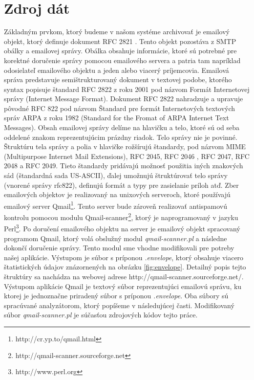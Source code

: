 \documentclass[11pt,twoside,a4paper]{book}
\begin{document}
\section{Zdroj dát}
Základným prvkom, ktorý budeme v našom systéme archivovať je emailový objekt, ktorý definuje dokument RFC 2821 \cite{Klensin:2001:SMT:RFC2821}. Tento objekt pozostáva z SMTP obálky a emailovej správy. Obálka obsahuje informácie, ktoré sú potrebné pre korektné doručenie správy pomocou emailového servera a patria tam napríklad odosielateľ emailového objektu a jeden alebo viacerý príjemcovia. Emailová správa predstavuje semištrukturovaný dokument \cite{Udell} v textovej podobe, ktorého syntax popisuje štandard RFC 2822 \cite{Resnick:2001:IMF:RFC2822} z roku 2001 pod názvom Formát Internetovej správy (Internet Message Format). Dokument RFC 2822 nahradzuje a upravuje pôvodné RFC 822 pod názvom Štandard pre formát Internetových textových správ ARPA z roku 1982 (Standard for the Fromat of ARPA Internet Text Messages). Obsah emailovej správy delíme na hlavičku a telo, ktoré sú od seba oddelené znakom reprezentujúcim prázdny riadok. Telo správy nie je povinné. Štruktúru tela správy a polia v hlavičke rožšírujú štandardy, pod názvom MIME (Multipurpose Internet Mail Extensions), RFC 2045, RFC 2046 \cite{Freed:1996:MIM:RFC2045,Freed:1996:MIM:RFC2046}, RFC 2047, RFC 2048 a RFC 2049. Tieto štandardy pridávajú možnosť použitia iných znakových sád (štandardná sada US-ASCII), ďalej umožnujú štruktúrovať telo správy (vnorené správy rfc822), definujú formát a typy pre zasielanie príloh atď.
Zber emailových objektov je realizovaný na unixových serveroch, ktoré používajú emailový server Qmail\footnote{http://cr.yp.to/qmail.html}. Tento server bude zároveň realizovať antispamovú kontrolu pomocou modulu Qmail-scanner\footnote{http://qmail-scanner.sourceforge.net}, ktorý je naprogramovaný v jazyku Perl\footnote{http://www.perl.org}. Po doručení emailového objektu na server je emailový objekt spracovaný programom Qmail, ktorý volá obslužný modul \emph{qmail-scanner.pl} a následne dokončí doručenie správy. Tento modul sme vhodne modifikovali pre potreby našej aplikácie. Výstupom je súbor s príponou \emph{.envelope}, ktorý obsahuje viacero štatistických údajov znázornených na obrázku \ref{fig:envelope}. Detailný popis tejto štruktúry sa nachádza na webovej adrese http://qmail-scanner.sourceforge.net/. Výstupom aplikácie Qmail je textový súbor reprezentujúci emailovú správu, ku ktorej je jednoznačne priradený súbor s príponou \emph{.envelope}. Oba súbory sú spracúvané analyzátorom, ktorý popíšeme v následujúcej časti. Modifikovaný súbor \emph{qmail-scanner.pl} je súčasťou zdrojových kódov tejto práce.
\end{document}
